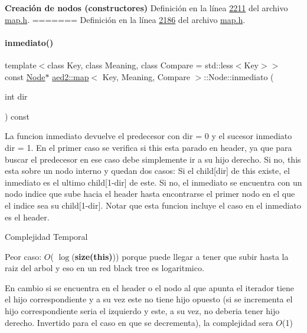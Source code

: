 \begin{Indent}{\bf \-Creación de nodos (constructores)}
\-Definición en la línea \hyperlink{map_8h_source_l02211}{2211} del archivo \hyperlink{map_8h_source}{map.\-h}.
=======
Definición en la línea \hyperlink{map_8h_source_l02186}{2186} del archivo \hyperlink{map_8h_source}{map.\+h}.

\mbox{\label{structaed2_1_1map_1_1Node_af812885685c8c3285136d444d5169b28_af812885685c8c3285136d444d5169b28}} 
\paragraph{\texorpdfstring{inmediato()}{inmediato()}}
{\footnotesize\ttfamily template$<$class Key, class Meaning, class Compare = std\+::less$<$\+Key$>$$>$ \\
const \hyperlink{structaed2_1_1map_1_1Node}{Node}$\ast$ \hyperlink{classaed2_1_1map}{aed2\+::map}$<$ Key, Meaning, Compare $>$\+::Node\+::inmediato (\begin{DoxyParamCaption}\item[{int}]{dir }\end{DoxyParamCaption}) const\hspace{0.3cm}{\ttfamily [inline]}}

La funcion inmediato devuelve el predecesor con dir = 0 y el sucesor inmediato dir = 1. En el primer caso se verifica si this esta parado en header, ya que para buscar el predecesor en ese caso debe simplemente ir a su hijo derecho. Si no, this esta sobre un nodo interno y quedan dos casos\+: Si el child\mbox{[}dir\mbox{]} de this existe, el inmediato es el ultimo child\mbox{[}1-\/dir\mbox{]} de este. Si no, el inmediato se encuentra con un nodo indice que sube hacia el header hasta encontrarse el primer nodo en el que el indice sea su child\mbox{[}1-\/dir\mbox{]}. Notar que esta funcion incluye el caso en el inmediato es el header.


\begin{DoxyDescription}
\item[Complejidad Temporal]
\begin{DoxyItemize}
\item Peor caso\+: $O$( $\log$({\bfseries size(this)})) porque puede llegar a tener que subir hasta la raiz del arbol y eso en un red black tree es logaritmico.
\item En cambio si se encuentra en el header o el nodo al que apunta el iterador tiene el hijo correspondiente y a su vez este no tiene hijo opuesto (si se incrementa el hijo correspondiente seria el izquierdo y este, a su vez, no deberia tener hijo derecho. Invertido para el caso en que se decrementa), la complejidad sera $O$(1)
\end{DoxyItemize}
\end{DoxyDescription}


\end{Indent}
